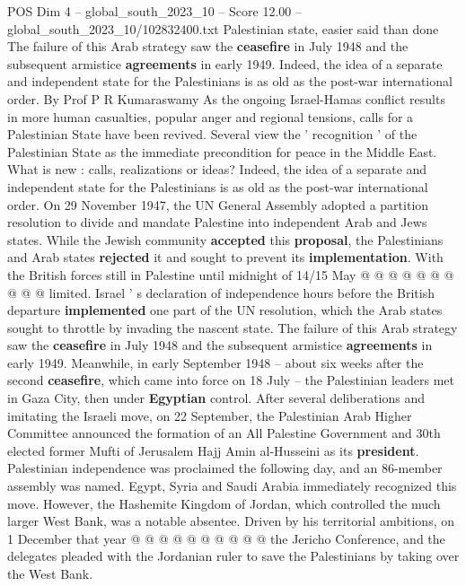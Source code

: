 \begin{textsample}{POS Dim 4 – global\_south\_2023\_10 – Score 12.00 – global\_south\_2023\_10/102832400.txt}  \label{ex:f4_pos_426}
Palestinian state, easier said than done The failure of this Arab strategy saw the \textbf{ceasefire} in July 1948 and the subsequent armistice \textbf{agreements} in early 1949.
Indeed, the idea of a separate and independent state for the Palestinians is as old as the post-war international order.
By Prof P R Kumaraswamy As the ongoing Israel-Hamas conflict results in more human casualties, popular anger and regional tensions, calls for a Palestinian State have been revived.
Several view the ' recognition ' of the Palestinian State as the immediate precondition for peace in the Middle East.
What is new : calls, realizations or ideas?
Indeed, the idea of a separate and independent state for the Palestinians is as old as the post-war international order.
On 29 November 1947, the UN General Assembly adopted a partition resolution to divide and mandate Palestine into independent Arab and Jews states.
While the Jewish community \textbf{accepted} this \textbf{proposal}, the Palestinians and Arab states \textbf{rejected} it and sought to prevent its \textbf{implementation}.
With the British forces still in Palestine until midnight of 14/15 May @ @ @ @ @ @ @ @ @ @ limited.
Israel ' s declaration of independence hours before the British departure \textbf{implemented} one part of the UN resolution, which the Arab states sought to throttle by invading the nascent state.
The failure of this Arab strategy saw the \textbf{ceasefire} in July 1948 and the subsequent armistice \textbf{agreements} in early 1949.
Meanwhile, in early September 1948 -- about six weeks after the second \textbf{ceasefire}, which came into force on 18 July -- the Palestinian leaders met in Gaza City, then under \textbf{Egyptian} control.
After several deliberations and imitating the Israeli move, on 22 September, the Palestinian Arab Higher Committee announced the formation of an All Palestine Government and 30th elected former Mufti of Jerusalem Hajj Amin al-Husseini as its \textbf{president}.
Palestinian independence was proclaimed the following day, and an 86-member assembly was named.
Egypt, Syria and Saudi Arabia immediately recognized this move.
However, the Hashemite Kingdom of Jordan, which controlled the much larger West Bank, was a notable absentee.
Driven by his territorial ambitions, on 1 December that year @ @ @ @ @ @ @ @ @ @ the Jericho Conference, and the delegates pleaded with the Jordanian ruler to save the Palestinians by taking over the West Bank.

\end{textsample}
